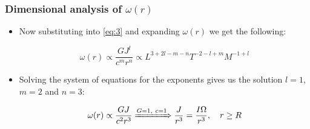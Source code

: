 \begin{frame}
\frametitle{Dimensional analysis of $\omega (r)$}

\begin{itemize}
	\item Now substituting into \eqref{eq:3} and expanding $\omega (r)$ we get the following: 
	\begin{block}{}
		\begin{equation}
			\omega (r)
			\propto
			\frac{G J^{l}}{c^{m} r^{n}}
			\propto
			L^{3 + 2l - m - n} T^{-2 - l + m} M^{-1 + l}
		\end{equation}
	\end{block}
	\item Solving the system of equations for the exponents gives us the solution $l=1$, $m=2$ and $n=3$:
	\begin{block}{}
		\begin{equation}
			\omega (r) \propto \frac{G J}{c^{2} r^{3}}
			\xRightarrow{G=1,\ c=1}
			\frac{J}{r^{3}} = \frac{I \Omega}{r^{3}}, \quad r \geq R
		\end{equation}
	\end{block}
\end{itemize}

\end{frame}